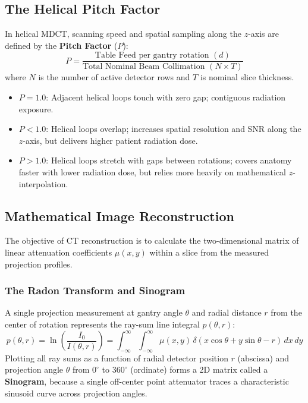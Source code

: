 \documentclass[11pt,a4paper]{article}
\begin{document}
\subsection{The Helical Pitch Factor}
In helical MDCT, scanning speed and spatial sampling along the $z$-axis are defined by the \textbf{Pitch Factor} ($P$):
\begin{equation}
    P = \frac{\text{Table Feed per gantry rotation } (d)}{\text{Total Nominal Beam Collimation } (N \times T)}
\end{equation}
where $N$ is the number of active detector rows and $T$ is nominal slice thickness.
\begin{itemize}
    \item $P = 1.0$: Adjacent helical loops touch with zero gap; contiguous radiation exposure.
    \item $P < 1.0$: Helical loops overlap; increases spatial resolution and SNR along the $z$-axis, but delivers higher patient radiation dose.
    \item $P > 1.0$: Helical loops stretch with gaps between rotations; covers anatomy faster with lower radiation dose, but relies more heavily on mathematical $z$-interpolation.
\end{itemize}

\subsection{Mathematical Image Reconstruction}
The objective of CT reconstruction is to calculate the two-dimensional matrix of linear attenuation coefficients $\mu(x,y)$ within a slice from the measured projection profiles.

\subsubsection{The Radon Transform and Sinogram}
A single projection measurement at gantry angle $\theta$ and radial distance $r$ from the center of rotation represents the ray-sum line integral $p(\theta, r)$:
\begin{equation}
    p(\theta, r) = \ln\left(\frac{I_0}{I(\theta, r)}\right) = \int_{-\infty}^{\infty} \int_{-\infty}^{\infty} \mu(x,y) \, \delta(x\cos\theta + y\sin\theta - r) \, dx \, dy
\end{equation}
Plotting all ray sums as a function of radial detector position $r$ (abscissa) and projection angle $\theta$ from $0^\circ$ to $360^\circ$ (ordinate) forms a 2D matrix called a \textbf{Sinogram}, because a single off-center point attenuator traces a characteristic sinusoid curve across projection angles.
\end{document}
